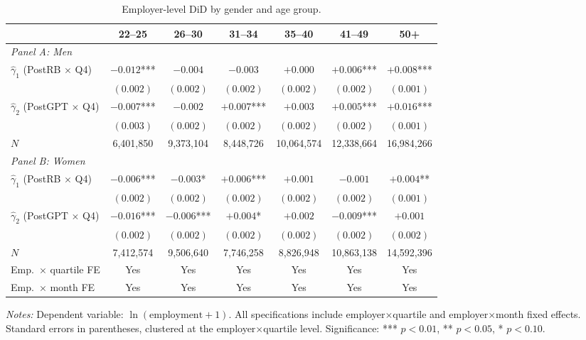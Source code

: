 \documentclass[preprint,12pt,authoryear]{elsarticle}
\begin{document}
\begin{table}[htbp]
\centering
\caption{Employer-level DiD by gender and age group.}
\label{tab:gender_did}
\footnotesize
\begin{tabular}{@{}lcccccc@{}}
\toprule
 & 22--25 & 26--30 & 31--34 & 35--40 & 41--49 & 50+ \\
\midrule
\multicolumn{7}{l}{\emph{Panel A: Men}} \\[2pt]
$\hat\gamma_1$ (PostRB $\times$ Q4) & $-0.012$*** & $-0.004$ & $-0.003$ & $+0.000$ & $+0.006$*** & $+0.008$*** \\
 & $(0.002)$ & $(0.002)$ & $(0.002)$ & $(0.002)$ & $(0.002)$ & $(0.001)$ \\[4pt]
$\hat\gamma_2$ (PostGPT $\times$ Q4) & $-0.007$*** & $-0.002$ & $+0.007$*** & $+0.003$ & $+0.005$*** & $+0.016$*** \\
 & $(0.003)$ & $(0.002)$ & $(0.002)$ & $(0.002)$ & $(0.002)$ & $(0.001)$ \\[4pt]
$N$ & 6,401,850 & 9,373,104 & 8,448,726 & 10,064,574 & 12,338,664 & 16,984,266 \\[8pt]
\multicolumn{7}{l}{\emph{Panel B: Women}} \\[2pt]
$\hat\gamma_1$ (PostRB $\times$ Q4) & $-0.006$*** & $-0.003$* & $+0.006$*** & $+0.001$ & $-0.001$ & $+0.004$** \\
 & $(0.002)$ & $(0.002)$ & $(0.002)$ & $(0.002)$ & $(0.002)$ & $(0.001)$ \\[4pt]
$\hat\gamma_2$ (PostGPT $\times$ Q4) & $-0.016$*** & $-0.006$*** & $+0.004$* & $+0.002$ & $-0.009$*** & $+0.001$ \\
 & $(0.002)$ & $(0.002)$ & $(0.002)$ & $(0.002)$ & $(0.002)$ & $(0.002)$ \\[4pt]
$N$ & 7,412,574 & 9,506,640 & 7,746,258 & 8,826,948 & 10,863,138 & 14,592,396 \\
\midrule
Emp.\ $\times$ quartile FE & Yes & Yes & Yes & Yes & Yes & Yes \\
Emp.\ $\times$ month FE & Yes & Yes & Yes & Yes & Yes & Yes \\
\bottomrule
\end{tabular}
\par\medskip
\noindent\parbox{\linewidth}{\raggedright\scriptsize \emph{Notes:} Dependent variable: $\ln(\text{employment} + 1)$. All specifications include employer$\times$quartile and employer$\times$month fixed effects. Standard errors in parentheses, clustered at the employer$\times$quartile level. Significance: *** $p<0.01$, ** $p<0.05$, * $p<0.10$.}

\end{table}
\end{document}
